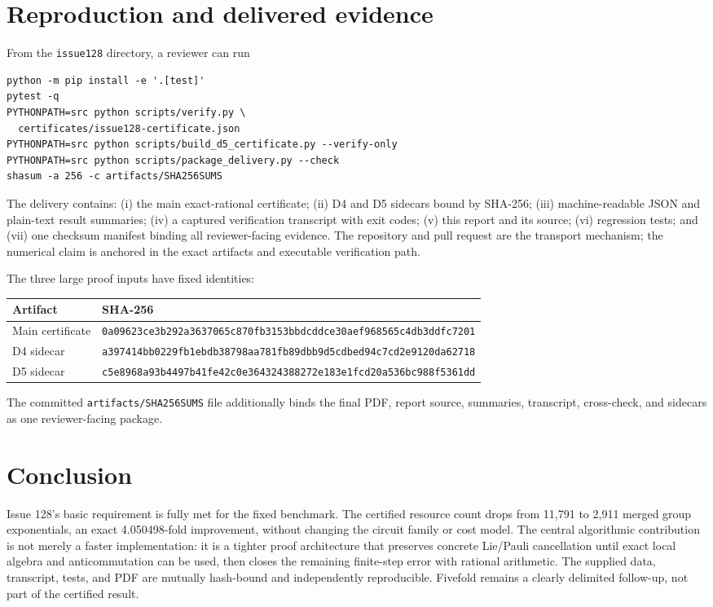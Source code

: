 \documentclass[11pt]{article}
\begin{document}
\section{Reproduction and delivered evidence}

From the \texttt{issue128} directory, a reviewer can run
\begin{verbatim}
python -m pip install -e '.[test]'
pytest -q
PYTHONPATH=src python scripts/verify.py \
  certificates/issue128-certificate.json
PYTHONPATH=src python scripts/build_d5_certificate.py --verify-only
PYTHONPATH=src python scripts/package_delivery.py --check
shasum -a 256 -c artifacts/SHA256SUMS
\end{verbatim}

The delivery contains: (i) the main exact-rational certificate; (ii) D4 and
D5 sidecars bound by SHA-256; (iii) machine-readable JSON and plain-text result
summaries; (iv) a captured verification transcript with exit codes; (v) this
report and its source; (vi) regression tests; and (vii) one checksum manifest
binding all reviewer-facing evidence.  The repository and pull request are the
transport mechanism; the numerical claim is anchored in the exact artifacts
and executable verification path.

The three large proof inputs have fixed identities:
\begin{center}
\small
\begin{tabularx}{\textwidth}{@{}lX@{}}
\toprule
Artifact & SHA-256 \\
\midrule
Main certificate &
\texttt{0a09623ce3b292a3637065c870fb3153bbdcddce30aef968565c4db3ddfc7201} \\
D4 sidecar &
\texttt{a397414bb0229fb1ebdb38798aa781fb89dbb9d5cdbed94c7cd2e9120da62718} \\
D5 sidecar &
\texttt{c5e8968a93b4497b41fe42c0e364324388272e183e1fcd20a536bc988f5361dd} \\
\bottomrule
\end{tabularx}
\end{center}
The committed \texttt{artifacts/SHA256SUMS} file additionally binds the final
PDF, report source, summaries, transcript, cross-check, and sidecars as one
reviewer-facing package.

\section{Conclusion}

Issue 128's basic requirement is fully met for the fixed benchmark.  The
certified resource count drops from 11,791 to 2,911 merged group exponentials,
an exact 4.050498-fold improvement, without changing the circuit family or
cost model.  The central algorithmic contribution is not merely a faster
implementation: it is a tighter proof architecture that preserves concrete
Lie/Pauli cancellation until exact local algebra and anticommutation can be
used, then closes the remaining finite-step error with rational arithmetic.
The supplied data, transcript, tests, and PDF are mutually hash-bound and
independently reproducible.  Fivefold remains a clearly delimited follow-up,
not part of the certified result.



\end{document}
